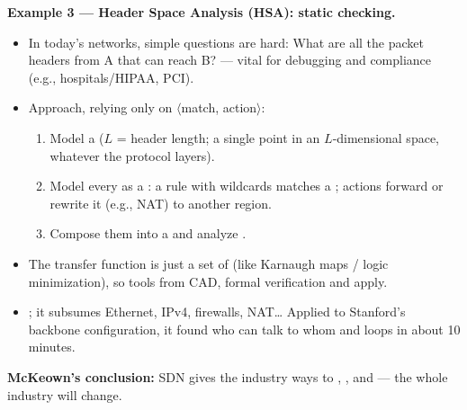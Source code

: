 \textbf{Example 3 --- Header Space Analysis (HSA): static checking.}
\begin{itemize}
\item In today's networks, simple questions are hard:  What are all the packet headers from A that can reach B?   --- vital for debugging and compliance (e.g., hospitals/HIPAA, PCI).
\item Approach, relying only on $\langle$match, action$\rangle$:
\begin{enumerate}
\item Model a  ($L$ = header length; a single point in an $L$-dimensional space, whatever the protocol layers).
\item Model every  as a : a rule with wildcards matches a ; actions forward or rewrite it (e.g., NAT) to another region.
\item Compose them into a  and analyze .
\end{enumerate}
\end{itemize}
\begin{itemize}
\item The transfer function is just a set of  (like Karnaugh maps / logic minimization), so tools from CAD, formal verification and  apply.
\item {}; it subsumes Ethernet, IPv4, firewalls, NAT\ldots{} Applied to Stanford's backbone configuration, it found who can talk to whom and loops in about 10 minutes.
\end{itemize}
\textbf{McKeown's conclusion:} SDN gives the industry ways to , , and  --- the whole industry will change.

